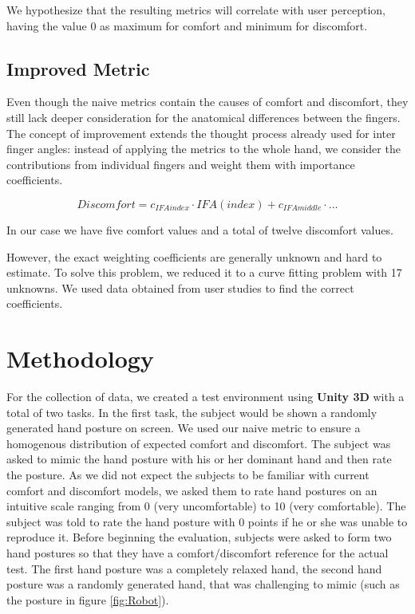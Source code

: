 \documentclass[headsepline,footsepline,footinclude=false,oneside,fontsize=11pt,paper=a4,listof=totoc,bibliography=totoc]{scrbook} %
\begin{document}
We hypothesize that the resulting metrics will correlate with user perception, having the value 0 as maximum  for comfort and minimum for discomfort.

\subsection{Improved Metric}

Even though the naive metrics contain the causes of comfort and discomfort, they still lack deeper consideration for the anatomical differences between the fingers.
The concept of improvement extends the thought process already used for inter finger angles: instead of applying the metrics to the whole hand, we consider the contributions from individual fingers and weight them with importance coefficients. 

	\[
	Discomfort = c_{IFAindex}\cdot IFA(index)  +  c_{IFAmiddle}\cdot...
	\]

In our case we have five comfort values and a total of twelve discomfort values. 

However, the exact weighting coefficients are generally unknown and hard to estimate. To solve this problem, we reduced it to a curve fitting problem with 17 unknowns. We used data obtained from user studies to find the correct coefficients.

\section{Methodology}

For the collection of data, we created a test environment using \textbf{Unity 3D} with a total of two tasks. In the first task, the subject would be shown a randomly generated hand posture on screen. We used our naive metric to ensure a homogenous distribution of expected comfort and discomfort. The subject was asked to mimic the hand posture with his or her dominant hand and then rate the posture. As we did not expect the subjects to be familiar with current comfort and discomfort models, we asked them to rate hand postures on an intuitive scale ranging from 0 (very uncomfortable) to 10 (very comfortable). The subject was told to rate the hand posture with 0 points if he or she was unable to reproduce it. Before beginning the evaluation, subjects were asked to form two hand postures so that they have a comfort/discomfort reference for the actual test. The first hand posture was a completely relaxed hand, the second hand posture was a randomly generated hand, that was challenging to mimic (such as the posture in figure \ref{fig:Robot}).
\end{document}
